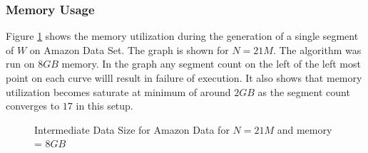 \documentclass[12pt,notitlepage,oneside]{report}
\begin{document}
\subsubsection{Memory Usage}
Figure \ref{comp:mem} shows the memory utilization during the generation of a single segment of $W$ on Amazon Data Set. The graph is shown for $N=21M$. The algorithm was run on $8GB$ memory. In the graph any segment count on the left of the left most point on each curve willl result in failure of execution. It also shows that memory utilization becomes saturate at minimum of around $2GB$ as the segment count converges to $17$ in this setup. 
\begin{figure}[!htbp]
    \centering
    \caption{Intermediate Data Size for Amazon Data for $N=21M$ and memory = $8GB$}
    \label{comp:mem}
\end{figure}



%

\end{document}
